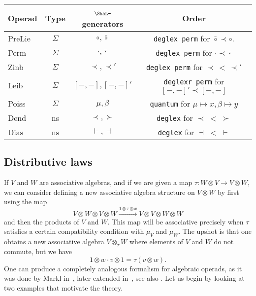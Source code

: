 \begin{center}
\begin{tabular}{@{}lccc@{}} \toprule
Operad & Type & $\Sha$-generators & Order \\
\midrule 
PreLie & $\Sigma$ & $\circ,\bar\circ$ & 
	\texttt{deglex perm} for $\bar\circ \prec \circ$.\\
Perm &   $\Sigma$ & $\cdot,\bar\cdot$ &
	\texttt{deglex perm} for $\cdot \prec \bar \cdot$  \\
Zinb &  $\Sigma$  & $\prec,\prec'$ &
	\texttt{deglex perm} for $\prec \, < \, \prec'$ \\

Leib &  $\Sigma$  & $[-,-],[-,-]'$ & 
	\texttt{deglexr perm} for $[-,-]' \prec [-,-]$\\

Poiss &   $\Sigma$ & $\mu,\beta$ & \texttt{quantum} for $\mu\mapsto x,\beta\mapsto y$ \\
Dend &  ns  & $\prec,\succ$ & \texttt{deglex} for $\prec\; < \;\succ$\\
Dias &   ns  & $\vdash,\dashv$ & \texttt{deglex} for $\dashv\; < \; \vdash$\\
\bottomrule
\end{tabular}
\end{center}




\subsection{Distributive laws}

If $V$ and $W$ are associative algebras, and if we
are given a map $\tau : W\otimes V\longrightarrow V\otimes W$,
we can consider defining a new associative algebra structure
on $V\otimes W$ by first using the map
\[
V\otimes W\otimes V\otimes W 
	\xrightarrow{1\otimes \tau\otimes x}
	 V\otimes V\otimes W\otimes W
	 \]
and then the products of $V$ and $W$. This map will be
associative precisely when $\tau$ satisfies a certain
compatibility condition with $\mu_V$ and $\mu_W$. The upshot
is that one obtains a new associative algebra
$V\otimes_\tau W$ where elements of $V$ and $W$ do not
commute, but we have
\[ 1\otimes w\cdot v\otimes 1 = \tau(v\otimes w).
\]
One can produce a completely analogous formalism 
for algebraic operads, as it was done by Markl 
in~\cite{MarklDistributive}, later extended
in~\cite{Vallette2004,Dotsenko2007},
see also \cite{Dotsenko2014}. Let us begin by 
looking at two examples that motivate
the theory.

